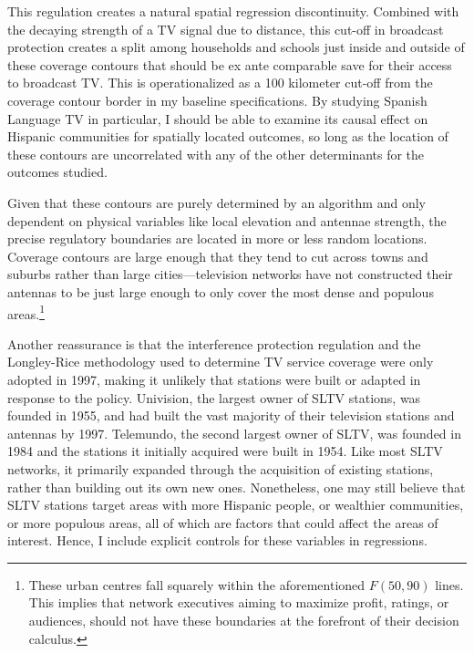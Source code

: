 \documentclass[11pt]{article}
\begin{document}

This regulation creates a natural spatial regression discontinuity. Combined with the decaying strength of a TV signal due to distance, this cut-off in broadcast protection creates a split among households and schools just inside and outside of these coverage contours that should be ex ante comparable save for their access to broadcast TV. This is operationalized as a 100 kilometer cut-off from the coverage contour border in my baseline specifications. By studying Spanish Language TV in particular, I should be able to examine its causal effect on Hispanic communities for spatially located outcomes, so long as the location of these contours are uncorrelated with any of the other determinants for the outcomes studied. 

Given that these contours are purely determined by an algorithm and only dependent on physical variables like local elevation and antennae strength, the precise regulatory boundaries are located in more or less random locations. Coverage contours are large enough that they tend to cut across towns and suburbs rather than large cities---television networks have not constructed their antennas to be just large enough to only cover the most dense and populous areas.\footnote{These urban centres fall squarely within the aforementioned $F(50,90)$ lines. This implies that network executives aiming to maximize profit, ratings, or audiences, should not have these boundaries at the forefront of their decision calculus.} 

Another reassurance is that the interference protection regulation and the Longley-Rice methodology used to determine TV service coverage were only adopted in 1997, making it unlikely that stations were built or adapted in response to the policy. Univision, the largest owner of SLTV stations, was founded in 1955, and had built the vast majority of their television stations and antennas by 1997. Telemundo, the second largest owner of SLTV, was founded in 1984 and the stations it initially acquired were built in 1954. Like most SLTV networks, it primarily expanded through the acquisition of existing stations, rather than building out its own new ones. Nonetheless, one may still believe that SLTV stations target areas with more Hispanic people, or wealthier communities, or more populous areas, all of which are factors that could affect the areas of interest. Hence, I include explicit controls for these variables in regressions.
\end{document}
